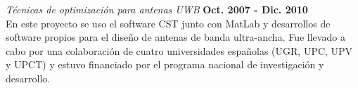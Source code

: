 \documentclass[a4paper,margin,line]{res}
\begin{document}
\begin{resume}
{\em Técnicas de optimización para antenas UWB} \hfill {\bf Oct. 2007 - Dic. 2010}\\
En este proyecto se uso el software CST junto con MatLab y desarrollos de software propios para el diseño de antenas de banda ultra-ancha. Fue llevado a cabo por una colaboración de cuatro universidades españolas (UGR, UPC, UPV y UPCT) y estuvo financiado por el programa nacional de investigación y desarrollo.

\end{resume}
\end{document}
